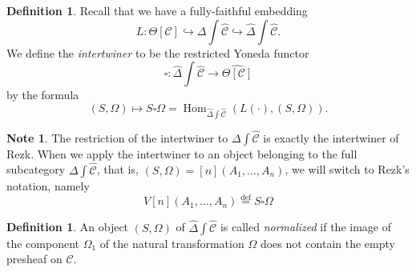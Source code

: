 \documentclass[a4paper]{article}
\numberwithin{equation}{subsection}
\theoremstyle{plain}   %
\theoremstyle{definition}
\newtheorem{defn}[equation]{Definition}
\newtheorem{note}[equation]{Note}
\theoremstyle{remark}
\theoremstyle{plain}
\DeclareMathOperator{\Hom}{Hom}
\newcommand{\psh}[1]{\ensuremath{\widehat{#1}}}
\providecommand{\C}{}
\renewcommand{\C}{\ensuremath{\mathcal{C}}}
\newcommand{\defeq}{\overset{\mathrm{def}}=}
\newcommand{\cellset}{\ensuremath{\widehat{\Theta[\mathcal{C}]}}}
\newcommand{\ssetlab}{\ensuremath{\widehat{\Delta} \int \widehat{\mathcal{C}}}}
\begin{document}
\begin{defn} Recall that we have a fully-faithful embedding \[L:\Theta[\C]\hookrightarrow \Delta\int\psh{\C}\hookrightarrow \ssetlab.\]  We define the \emph{intertwiner} to be the restricted Yoneda functor 
	\[
		\square:\ssetlab \to \cellset
	\]
	by the formula 
	\[
		(S,\Omega)\mapsto S\square\Omega=\Hom_{\ssetlab}(L(\cdot), (S,\Omega)).
	\]
\end{defn}

\begin{note} The restriction of the intertwiner to \(\Delta \int \psh{\C}\) is exactly the intertwiner of Rezk.  When we apply the intertwiner to an object belonging to the full subcategory \(\Delta\int \psh{\C}\), that is, \((S,\Omega)=[n](A_1,\dots, A_n)\), we will switch to Rezk's notation, namely \[V[n](A_1,\dots,A_n)\defeq S\square \Omega\]
\end{note}

\begin{defn} An object \((S,\Omega)\) of \(\ssetlab\) is called \emph{normalized} if the image of the component \(\Omega_1\) of the natural transformation \(\Omega\) does not contain the empty presheaf on \(\C\).
\end{defn}
\end{document}
